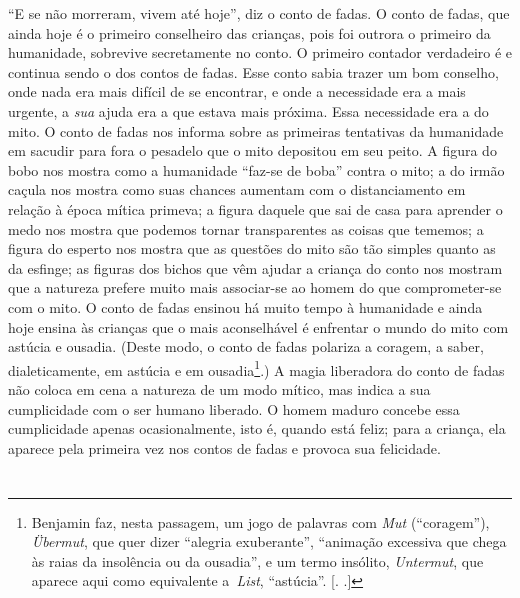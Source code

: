 ``E se não morreram, vivem até hoje'', diz o conto de fadas. O conto de
fadas, que ainda hoje é o primeiro conselheiro das crianças, pois foi
outrora o primeiro da humanidade, sobrevive secretamente no conto. O
primeiro contador verdadeiro é e continua sendo o dos contos de fadas.
Esse conto sabia trazer um bom conselho, onde nada era mais difícil de
se encontrar, e onde a necessidade era a mais urgente, a \emph{sua}
ajuda era a que estava mais próxima. Essa necessidade era a do mito. O
conto de fadas nos informa sobre as primeiras tentativas da humanidade
em sacudir para fora o pesadelo que o mito depositou em seu peito. A
figura do bobo nos mostra como a humanidade ``faz-se de boba'' contra o
mito; a do irmão caçula nos mostra como suas chances aumentam com o
distanciamento em relação à época mítica primeva; a figura daquele que
sai de casa para aprender o medo nos mostra que podemos tornar
transparentes as coisas que tememos; a figura do esperto nos mostra que
as questões do mito são tão simples quanto as da esfinge; as figuras dos
bichos que vêm ajudar a criança do conto nos mostram que a natureza
prefere muito mais associar-se ao homem do que comprometer-se com o
mito. O conto de fadas ensinou há muito tempo à humanidade e ainda hoje
ensina às crianças que o mais aconselhável é enfrentar o mundo do mito
com astúcia e ousadia. (Deste modo, o conto de fadas polariza a coragem,
a saber, dialeticamente, em astúcia e em ousadia\footnote{Benjamin faz,
  nesta passagem, um jogo de palavras com \emph{Mut} (``coragem''),
  \emph{Übermut}, que quer dizer ``alegria exuberante'', ``animação
  excessiva que chega às raias da insolência ou da ousadia'', e um termo
  insólito, \emph{Untermut}, que aparece aqui como equivalente
  a~\emph{List}, ``astúcia''. [. .]}.) A magia liberadora do
conto de fadas não coloca em cena a natureza de um modo mítico, mas
indica a sua cumplicidade com o ser humano liberado\label{supra5}. O homem maduro
concebe essa cumplicidade apenas ocasionalmente, isto é, quando está
feliz; para a criança, ela aparece pela primeira vez nos contos de fadas
e provoca sua felicidade.

\section{}

